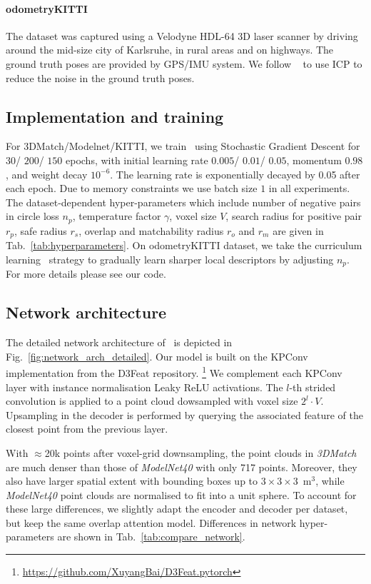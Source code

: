 \paragraph{odometryKITTI}
The dataset was captured using a Velodyne HDL-64 3D laser scanner by driving around the mid-size city of Karlsruhe, in rural areas and on highways. The ground truth poses are provided by GPS/IMU system. We follow ~\cite{bai2020d3feat} to use ICP to reduce the noise in the ground truth poses. 


\subsection{Implementation and training}

\label{sec:training_supp}
For 3DMatch/Modelnet/KITTI, we train \acro\ using Stochastic Gradient Descent for $30$/ $200$/ $150$ epochs, with initial learning rate $0.005$/ $0.01$/ $0.05$, momentum $0.98$, and weight decay $10^{-6}$. The learning rate is exponentially decayed by 0.05 after each epoch. Due to memory constraints we use batch size $1$ in all experiments. The dataset-dependent hyper-parameters which include number of negative pairs in circle loss $n_p$, temperature factor $\gamma$, voxel size $V$, search radius for positive pair $r_p$, safe radius $r_s$, overlap and matchability radius $r_o$ and $r_m$ are given in Tab.~\ref{tab:hyperparameters}. On odometryKITTI dataset, we take the curriculum learning~\cite{bengio2009curriculum} strategy to gradually learn sharper local descriptors by adjusting $n_p$. For more details please see our code.

\subsection{Network architecture}
\label{sec:network_arch_supp}

The detailed network architecture of \acro\ is depicted in Fig.~\ref{fig:network_arch_detailed}. Our model is built on the KPConv implementation from the D3Feat repository.%
\footnote{\url{https://github.com/XuyangBai/D3Feat.pytorch}} %
We complement each KPConv layer with instance normalisation Leaky ReLU activations. The $l$-th strided convolution is applied to a point cloud dowsampled with voxel size $2^{l}\cdot V$. Upsampling in the decoder is performed by querying the associated feature of the closest point from the previous layer.  

With $\approx$20k points after voxel-grid downsampling, the point clouds in \emph{3DMatch}  are much denser than those of \emph{ModelNet40} with only 717 points. Moreover, they also have larger spatial extent with bounding boxes up to $3\times3\times3$~$\text{m}^3$, while \emph{ModelNet40} point clouds are normalised to fit into a unit sphere.
To account for these large differences, we slightly adapt the encoder and decoder per dataset, but keep the same overlap attention model. Differences in network hyper-parameters are shown in Tab.~\ref{tab:compare_network}. 


